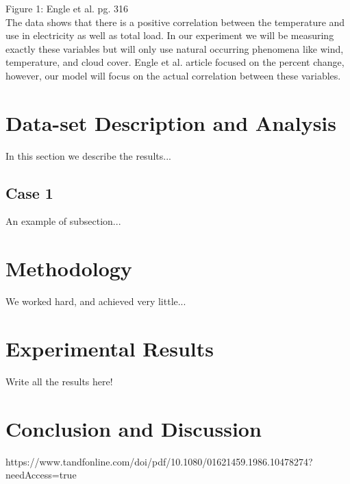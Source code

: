 \documentclass[10pt]{article}
\begin{document}
Figure 1: Engle et al. pg. 316
\\The data shows that there is a positive correlation between the temperature and use in electricity as well as total load. In our experiment we will be measuring exactly these variables but will only use natural occurring phenomena like wind, temperature, and cloud cover. Engle et al. article focused on the percent change, however, our model will focus on the actual correlation between these variables.


\section{Data-set Description and Analysis}\label{sec:3}
In this section we describe the results...

\subsection{Case 1}
An example of subsection...

\section{Methodology}\label{sec:4}
We worked hard, and achieved very little...

\newpage

\section{Experimental Results}\label{sec:5}

Write all the results here!

\section{Conclusion and Discussion}\label{sec:6}



 
 
https://www.tandfonline.com/doi/pdf/10.1080/01621459.1986.10478274?needAccess=true
\end{document}
